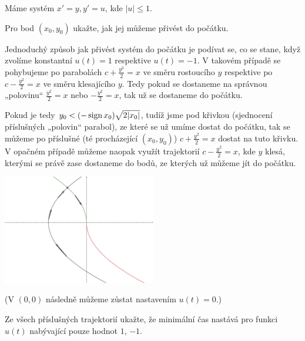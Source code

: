 \documentclass[12pt]{article}					%
\begin{document}
Máme systém $x' = y, y' = u$, kde $|u| ≤ 1$.

\begin{priklad}[I]
	Pro bod $(x_0, y_0)$ ukažte, jak jej můžeme přivést do počátku.

	\begin{reseni}
		Jednoduchý způsob jak přivést systém do počátku je podívat se, co se stane, když zvolíme konstantní $u(t) = 1$ respektive $u(t) = -1$. V takovém případě se pohybujeme po parabolách $c + \frac{y^2}{2} = x$ ve směru rostoucího $y$ respektive po $c - \frac{y^2}{2} = x$ ve směru klesajícího $y$. Tedy pokud se dostaneme na správnou „polovinu“ $\frac{y^2}{2} = x$ nebo $-\frac{y^2}{2} = x$, tak už se dostaneme do počátku.

		Pokud je tedy $y_0 < (-\operatorname{sign} x_0) \sqrt{2|x_0|}$, tudíž jsme pod křivkou (sjednocení příslušných „polovin“ parabol), ze které se už umíme dostat do počátku, tak se můžeme po příslušné (té procházející $(x_0, y_0)$) $c + \frac{y^2}{2} = x$ dostat na tuto křivku. V opačném případě můžeme naopak využít trajektorií $c - \frac{y^2}{2} = x$, kde $y$ klesá, kterými se právě zase dostaneme do bodů, ze kterých už můžeme jít do počátku.

		\begin{center}
			\includegraphics[width=0.5\textwidth]{ODR2_DU1.eps}
		\end{center}

		(V $(0, 0)$ následně můžeme zůstat nastavením $u(t) = 0$.)
	\end{reseni}

	\pagebreak

	Ze všech příslušných trajektorií ukažte, že minimální čas nastává pro funkci $u(t)$ nabývající pouze hodnot $1$, $-1$.


\end{priklad}
\end{document}
